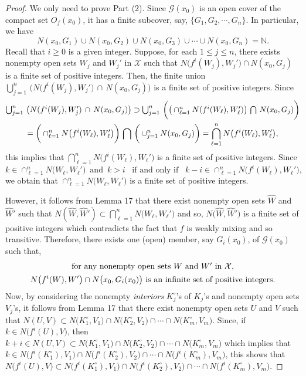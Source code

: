 \documentclass[12pt]{article}
\begin{document}
\noindent
\begin{proof}
We only need to prove Part (2).  Since $\mathcal G(x_0)$ is an open cover of the compact set $\overline{O_f(x_0)}$, it has a finite subcover, say, $\{ G_1, G_2, \cdots, G_n \}$.  In particular, we have 
$$
N(x_0, G_1) \cup N(x_0, G_2) \cup N(x_0, G_3) \cup \cdots \cup N(x_0, G_n) = \mathbb N.
$$ 
\indent Recall that $i \ge 0$ is a given integer.  Suppose, for each $1 \le j \le n$, there exists nonempty open sets $W_j$ and $W_j'$ in $\mathcal X$ such that $N\big(f^i(W_j), W_j'\big) \cap N(x_0, G_j)$ is a finite set of positive integers.  Then, the finite union $\bigcup_{j=1}^{n} \, \big(N\big(f^i(W_j), W_j'\big) \, \cap \, N(x_0, G_j)\big)$ is a finite set of positive integers.  Since
\begin{multline*}
$$
\bigcup_{j=1}^n \, \big(N(f^i(W_j), W_j') \, \cap \, N(x_0, G_j)\big) \supset \bigcup_{j=1}^n \, \bigg(\big(\cap_{\ell=1}^n N(f^i(W_\ell), W_\ell')\big) \, \bigcap \, N(x_0, G_j)\bigg) \\ 
= \bigg(\cap_{\ell=1}^n N\big(f^i(W_\ell), W_\ell'\big)\bigg) \, \bigcap \, \bigg(\cup_{j=1}^n N(x_0, G_j)\bigg) = \bigcap_{\ell=1}^n N\big(f^i(W_\ell), W_\ell'\big),
$$
\end{multline*}
this implies that $\bigcap_{\ell=1}^n N\big(f^i(W_\ell), W_\ell'\big)$ is a finite set of positive integers.  Since
$$
k \in \cap_{\ell=1}^n N\big(W_\ell, W_\ell'\big) \,\,\, \text{and} \,\,\, k > i \,\,\,\,\, \text{if and only if} \,\,\,\,\, k-i \in \cap_{\ell=1}^n N\big(f^i(W_\ell), W_\ell'\big),
$$
we obtain that $\cap_{\ell=1}^n N\big(W_\ell, W_\ell'\big)$ is a finite set of positive integers.

However, it follows from Lemma 17 that there exist nonempty open sets $\widehat W$ and $\widehat W'$ such that $N(\widehat W, \widehat W') \subset \bigcap_{\ell=1}^n N\big(W_\ell, W_\ell'\big)$ and so, $N\big(\widehat W, \widehat W'\big)$ is a finite set of positive integers which contradicts the fact that $f$ is weakly mixing and so transitive.  Therefore, there exists one (open) member, say $G_i(x_0)$, of $\mathcal G(x_0)$ such that, 
\begin{multline*} 
$$
\text{for any nonempty open sets} \,\, W \,\, \text{and} \,\, W' \,\, \text{in} \,\, \mathcal X, \\ 
N\big(f^i(W), W'\big) \cap N\big(x_0, G_i(x_0)\big) \,\, \text{is an infinite set of positive integers}.
$$
\end{multline*}
\indent Now, by considering the nonempty {\it interiors} $K_j^\circ$'s of $K_j$'s and nonempty open sets $V_j$'s, it follows from Lemma 17 that there exist nonempty open sets $U$ and $V$ such that $N(U, V) \subset N\big(K_1^\circ, V_1\big) \cap N\big(K_2^\circ, V_2\big) \cap \cdots \cap N\big(K_m^\circ, V_m\big)$.  Since, if $k \in N\big(f^i(U), V\big)$, then $k+i \in N(U, V) \subset N\big(K_1^\circ, V_1\big) \cap N\big(K_2^\circ, V_2\big) \cap \cdots \cap N\big(K_m^\circ, V_m\big)$ which implies that $k \in N\big(f^i(K_1^\circ), V_1\big) \cap N\big(f^i(K_2^\circ), V_2\big) \cap \cdots \cap N\big(f^i(K_m^\circ), V_m\big)$, this shows that $N\big(f^i(U), V\big) \subset N\big(f^i(K_1^\circ), V_1\big) \cap N\big(f^i(K_2^\circ), V_2\big) \cap \cdots \cap N\big(f^i(K_m^\circ), V_m\big)$.


\end{proof}
\end{document}
